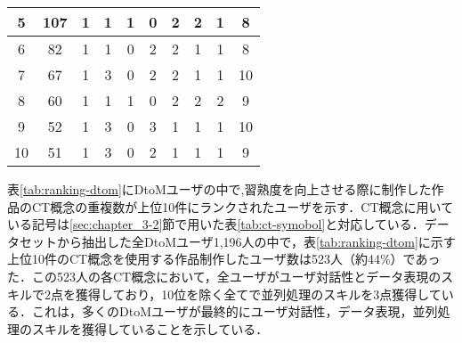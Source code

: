 \documentclass[11pt,dvipdfmx]{jreport}
\begin{document}
\begin{table}[]
\begin{tabular}{c|c|cccccccc}
5                   & 107                  & \multicolumn{1}{c|}{1} & \multicolumn{1}{c|}{1} & \multicolumn{1}{c|}{1} & \multicolumn{1}{c|}{0} & \multicolumn{1}{c|}{2} & \multicolumn{1}{c|}{2} & \multicolumn{1}{c|}{1} & 8  \\ \hline
6                   & 82                   & \multicolumn{1}{c|}{1} & \multicolumn{1}{c|}{1} & \multicolumn{1}{c|}{0} & \multicolumn{1}{c|}{2} & \multicolumn{1}{c|}{2} & \multicolumn{1}{c|}{1} & \multicolumn{1}{c|}{1} & 8  \\ \hline
7                   & 67                   & \multicolumn{1}{c|}{1} & \multicolumn{1}{c|}{3} & \multicolumn{1}{c|}{0} & \multicolumn{1}{c|}{2} & \multicolumn{1}{c|}{2} & \multicolumn{1}{c|}{1} & \multicolumn{1}{c|}{1} & 10 \\ \hline
8                   & 60                   & \multicolumn{1}{c|}{1} & \multicolumn{1}{c|}{1} & \multicolumn{1}{c|}{1} & \multicolumn{1}{c|}{0} & \multicolumn{1}{c|}{2} & \multicolumn{1}{c|}{2} & \multicolumn{1}{c|}{2} & 9  \\ \hline
9                   & 52                   & \multicolumn{1}{c|}{1} & \multicolumn{1}{c|}{3} & \multicolumn{1}{c|}{0} & \multicolumn{1}{c|}{3} & \multicolumn{1}{c|}{1} & \multicolumn{1}{c|}{1} & \multicolumn{1}{c|}{1} & 10 \\ \hline
10                  & 51                   & \multicolumn{1}{c|}{1} & \multicolumn{1}{c|}{3} & \multicolumn{1}{c|}{0} & \multicolumn{1}{c|}{2} & \multicolumn{1}{c|}{1} & \multicolumn{1}{c|}{1} & \multicolumn{1}{c|}{1} & 9 \\ \hline
\end{tabular}
\end{table}

表\ref{tab:ranking-dtom}にDtoMユーザの中で,習熟度を向上させる際に制作した作品のCT概念の重複数が上位10件にランクされたユーザを示す．CT概念に用いている記号は\ref{sec:chapter_3-2}節で用いた表\ref{tab:ct-symobol}と対応している．データセットから抽出した全DtoMユーザ1,196人の中で，表\ref{tab:ranking-dtom}に示す上位10件のCT概念を使用する作品制作したユーザ数は523人（約44\%）であった．この523人の各CT概念において，全ユーザがユーザ対話性とデータ表現のスキルで2点を獲得しており，10位を除く全てで並列処理のスキルを3点獲得している．これは，多くのDtoMユーザが最終的にユーザ対話性，データ表現，並列処理のスキルを獲得していることを示している．
\end{document}
